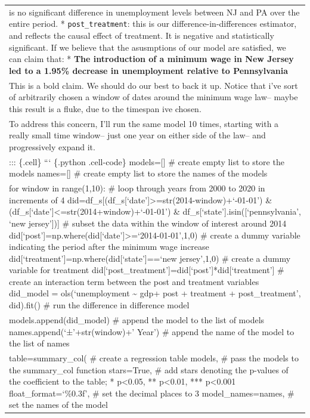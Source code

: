 \documentclass[
  letterpaper,
  DIV=11,
  numbers=noendperiod]{scrreprt}
\begin{document}
\begin{longtable}[]{@{}
  >{\raggedright\arraybackslash}p{}@{}}
is no significant difference in unemployment levels between NJ and PA
over the entire period. * \texttt{post\_treatment}: this is our
difference-in-differences estimator, and reflects the causal effect of
treatment. It is negative and statistically significant. If we believe
that the asusmptions of our model are satisfied, we can claim that: *
\textbf{The introduction of a minimum wage in New Jersey led to a 1.95\%
decrease in unemployment relative to Pennsylvania} \\
This is a bold claim. We should do our best to back it up. Notice that
i've sort of arbitrarily chosen a window of dates around the minimum
wage law-- maybe this result is a fluke, due to the timespan ive
chosen. \\
To address this concern, I'll run the same model 10 times, starting with
a really small time window-- just one year on either side of the law--
and progressively expand it. \\
::: \{.cell\} ``` \{.python .cell-code\} models={[}{]} \# create empty
list to store the models names={[}{]} \# create empty list to store the
names of the models \\
for window in range(1,10): \# loop through years from 2000 to 2020 in
increments of 4
did=df\_s{[}(df\_s{[}`date'{]}\textgreater=str(2014-window)+`-01-01') \&
(df\_s{[}`date'{]}\textless=str(2014+window)+`-01-01') \&
df\_s{[}`state'{]}.isin({[}`pennsylvania', `new jersey'{]}){]} \# subset
the data within the window of interest around 2014
did{[}`post'{]}=np.where(did{[}`date'{]}\textgreater=`2014-01-01',1,0)
\# create a dummy variable indicating the period after the minimum wage
increase did{[}`treatment'{]}=np.where(did{[}`state'{]}==`new
jersey',1,0) \# create a dummy variable for treatment
did{[}`post\_treatment'{]}=did{[}`post'{]}*did{[}`treatment'{]} \#
create an interaction term between the post and treatment variables
did\_model = ols(`unemployment \textasciitilde{} gdp+ post + treatment +
post\_treatment', did).fit() \# run the difference in difference
model \\
models.append(did\_model) \# append the model to the list of models
names.append(`±'+str(window)+' Year') \# append the name of the model to
the list of names \\
table=summary\_col( \# create a regression table models, \# pass the
models to the summary\_col function stars=True, \# add stars denoting
the p-values of the coefficient to the table; * p\textless0.05, **
p\textless0.01, *** p\textless0.001 float\_format=`\%0.3f', \# set the
decimal places to 3 model\_names=names, \# set the names of the model

\end{longtable}
\end{document}
